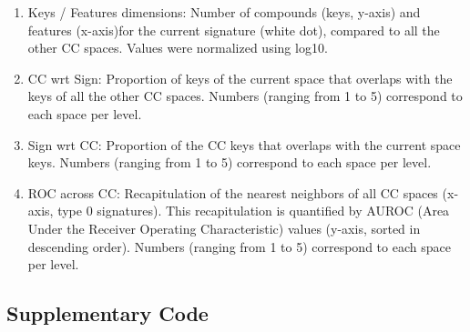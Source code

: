 \begin{enumerate}
    \item[\textbullet]Keys / Features dimensions: Number of compounds (keys, y-axis) and features (x-axis)for the current signature (white dot), compared to all the other CC spaces. Values were normalized using log10.
    \item[\textbullet]CC wrt Sign: Proportion of keys of the current space that overlaps with the keys of all the other CC spaces. Numbers (ranging from 1 to 5) correspond to each space per level.
    \item[\textbullet]Sign wrt CC: Proportion of the CC keys that overlaps with the current space keys. Numbers (ranging from 1 to 5) correspond to each space per level.
    \item[\textbullet]ROC across CC: Recapitulation of the nearest neighbors of all CC spaces (x-axis, type 0 signatures). This recapitulation is quantified by AUROC (Area Under the Receiver Operating Characteristic) values (y-axis, sorted in descending order). Numbers (ranging from 1 to 5) correspond to each space per level.
\end{enumerate}


\subsection{Supplementary Code}

